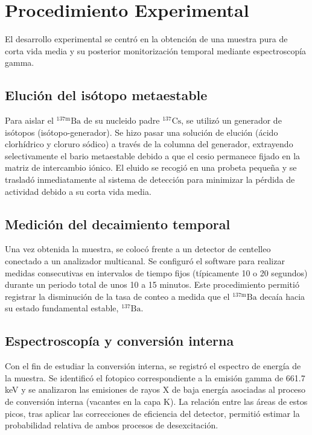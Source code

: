 \documentclass[9pt,a4paper,twocolumn,twoside]{rho-class/rho}
\begin{document}
\section{Procedimiento Experimental}

El desarrollo experimental se centró en la obtención de una muestra pura de corta vida media y su posterior monitorización temporal mediante espectroscopía gamma. %

\subsection{Elución del isótopo metaestable}
Para aislar el $^{137\text{m}}\text{Ba}$ de su nucleido padre $^{137}\text{Cs}$, se utilizó un generador de isótopos (isótopo-generador). %
Se hizo pasar una solución de elución (ácido clorhídrico y cloruro sódico) a través de la columna del generador, extrayendo selectivamente el bario metaestable debido a que el cesio permanece fijado en la matriz de intercambio iónico. %
El eluido se recogió en una probeta pequeña y se trasladó inmediatamente al sistema de detección para minimizar la pérdida de actividad debido a su corta vida media. %

\subsection{Medición del decaimiento temporal}
Una vez obtenida la muestra, se colocó frente a un detector de centelleo conectado a un analizador multicanal. %
Se configuró el software para realizar medidas consecutivas en intervalos de tiempo fijos (típicamente 10 o 20 segundos) durante un periodo total de unos 10 a 15 minutos. %
Este procedimiento permitió registrar la disminución de la tasa de conteo a medida que el $^{137\text{m}}\text{Ba}$ decaía hacia su estado fundamental estable, $^{137}\text{Ba}$. %

\subsection{Espectroscopía y conversión interna}
Con el fin de estudiar la conversión interna, se registró el espectro de energía de la muestra. %
Se identificó el fotopico correspondiente a la emisión gamma de 661.7 keV y se analizaron las emisiones de rayos X de baja energía asociadas al proceso de conversión interna (vacantes en la capa K). %
La relación entre las áreas de estos picos, tras aplicar las correcciones de eficiencia del detector, permitió estimar la probabilidad relativa de ambos procesos de desexcitación. %
\end{document}
